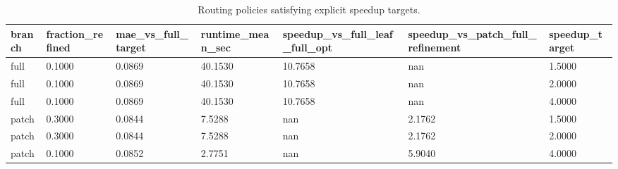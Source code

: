 \begin{table}[t]
\centering
\caption{Routing policies satisfying explicit speedup targets.}
\label{tab:routing}
\scriptsize
\begin{tabular}{lllllll}
\toprule
branch & fraction\_refined & mae\_vs\_full\_target & runtime\_mean\_sec & speedup\_vs\_full\_leaf\_full\_opt & speedup\_vs\_patch\_full\_refinement & speedup\_target \\
\midrule
full & 0.1000 & 0.0869 & 40.1530 & 10.7658 & nan & 1.5000 \\
full & 0.1000 & 0.0869 & 40.1530 & 10.7658 & nan & 2.0000 \\
full & 0.1000 & 0.0869 & 40.1530 & 10.7658 & nan & 4.0000 \\
patch & 0.3000 & 0.0844 & 7.5288 & nan & 2.1762 & 1.5000 \\
patch & 0.3000 & 0.0844 & 7.5288 & nan & 2.1762 & 2.0000 \\
patch & 0.1000 & 0.0852 & 2.7751 & nan & 5.9040 & 4.0000 \\
\bottomrule
\end{tabular}
\end{table}
